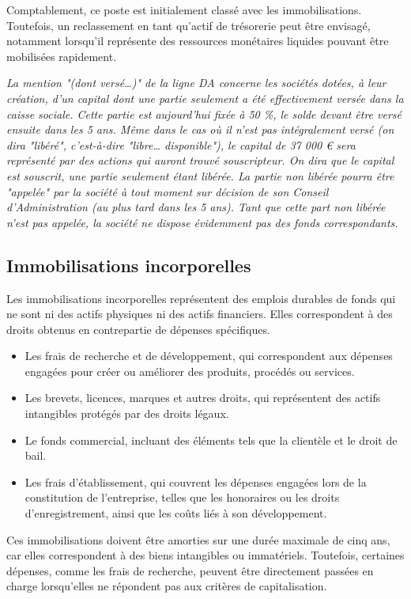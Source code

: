 \documentclass[a4paper, 12pt]{report}
\begin{document}
Comptablement, ce poste est initialement classé avec les immobilisations. Toutefois, un reclassement en tant qu'actif de trésorerie peut être envisagé, notamment lorsqu'il représente des ressources monétaires liquides pouvant être mobilisées rapidement.

\textit{La mention "(dont versé…)" de la ligne DA concerne les sociétés dotées, à leur
création, d’un capital dont une partie seulement a été effectivement versée dans la
caisse sociale. Cette partie est aujourd’hui fixée à 50 \%, le solde devant être versé
ensuite dans les 5 ans. Même dans le cas où il n’est pas intégralement versé (on dira
"libéré", c’est-à-dire "libre… disponible"), le capital de 37 000 € sera représenté
par des actions qui auront trouvé souscripteur. On dira que le capital est souscrit,
une partie seulement étant libérée. La partie non libérée pourra être "appelée" par
la société à tout moment sur décision de son Conseil d’Administration (au plus
tard dans les 5 ans). Tant que cette part non libérée n’est pas appelée, la société ne
dispose évidemment pas des fonds correspondants.}

\subsection{Immobilisations incorporelles}


Les immobilisations incorporelles représentent des emplois durables de fonds qui ne sont ni des actifs physiques ni des actifs financiers. Elles correspondent à des droits obtenus en contrepartie de dépenses spécifiques.

\begin{itemize}
	\item Les frais de recherche et de développement, qui correspondent aux dépenses engagées pour créer ou améliorer des produits, procédés ou services.

	\item Les brevets, licences, marques et autres droits, qui représentent des actifs intangibles protégés par des droits légaux.

	\item Le fonds commercial, incluant des éléments tels que la clientèle et le droit de bail.

	\item Les frais d’établissement, qui couvrent les dépenses engagées lors de la constitution de l’entreprise, telles que les honoraires ou les droits d’enregistrement, ainsi que les coûts liés à son développement.

\end{itemize}
Ces immobilisations doivent être amorties sur une durée maximale de cinq ans, car elles correspondent à des biens intangibles ou immatériels. Toutefois, certaines dépenses, comme les frais de recherche, peuvent être directement passées en charge lorsqu'elles ne répondent pas aux critères de capitalisation.
\end{document}
